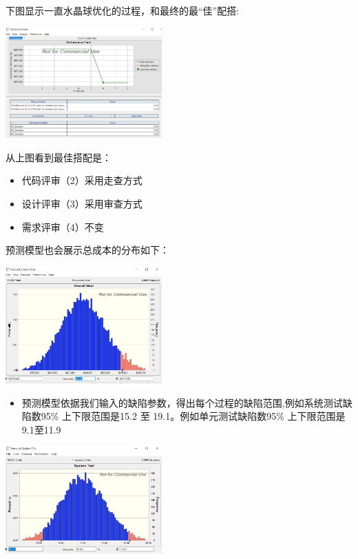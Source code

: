 下图显示一直水晶球优化的过程，和最终的最``佳''配搭:


\includegraphics[width=6cm]{YH.PNG}

从上图看到最佳搭配是：

\begin{itemize}
\tightlist
\item
  代码评审（2）采用走查方式
\item
  设计评审（3）采用审查方式
\item
  需求评审（4）不变
\end{itemize}

预测模型也会展示总成本的分布如下：

\includegraphics[width=6cm]{YH-OG95.PNG}

\begin{itemize}
\tightlist
\item
  预测模型依据我们输入的缺陷参数，得出每个过程的缺陷范围,例如系统测试缺陷数95\%
  上下限范围是15.2 至 19.1。例如单元测试缺陷数95\% 上下限范围是9.1至11.9
\end{itemize}

\includegraphics[width=6cm]{YH-ST.PNG}

